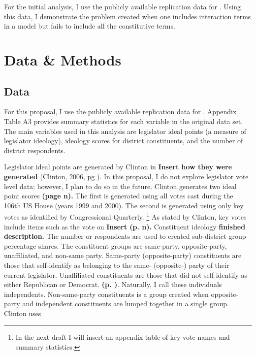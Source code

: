\documentclass[10pt,letterpaper]{article}
\begin{document}
For the initial analysis, I use the publicly available \cite{Clinton2009} replication data for \cite{Clinton2006}. Using this data, I demonstrate the problem created when one includes interaction terms in a model but fails to include all the constitutive terms.

\section{Data \& Methods} 

\subsection{Data}
For this proposal, I use the publicly available \cite{Clinton2009} replication data for \cite{Clinton2006}. Appendix Table A3 provides summary statistics for each variable in the original data set. The main variables used in this analysis are legislator ideal points (a measure of legislator ideology), ideology scores for district constituents, and the number of district respondents.


Legislator ideal points are generated by Clinton in \textbf{Insert how they were generated} (Clinton, 2006, pg ). In this proposal, I do not explore legislator vote level data; however, I plan to do so in the future. Clinton generates two ideal point scores \textbf{(page n).} The first is generated using all votes cast during the 106th US House (years 1999 and 2000).  The second is generated using only key votes as identified by Congressional Quarterly. \footnote{In the next draft I will insert an appendix table of key vote names and summary statistics.} As stated by Clinton, key votes include items such as the vote on \textbf{Insert (p. n).} Constituent ideology \textbf{finished description.} The number or respondents are used to created sub-district group percentage shares. The constituent groups are same-party, opposite-party, unaffiliated, and non-same party. Same-party (opposite-party) constituents are those that self-identify as belonging to the same- (opposite-) party of their current legislator. Unaffiliated constituents are those that did not self-identify as either Republican or Democrat. \textbf{(p. )}. Naturally, I call these individuals independents. Non-same-party constituents is a group created when opposite-party and independent constituents are lumped together in a single group. Clinton uses 
\end{document}
